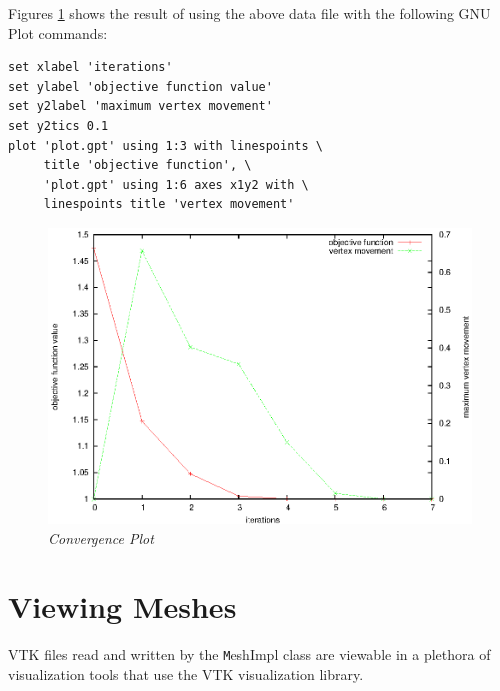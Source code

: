 Figures \ref{fig:iterplot} shows the result of using the above data file with the following GNU Plot commands:
\begin{verbatim}
set xlabel 'iterations'
set ylabel 'objective function value'
set y2label 'maximum vertex movement'
set y2tics 0.1
plot 'plot.gpt' using 1:3 with linespoints \
     title 'objective function', \
     'plot.gpt' using 1:6 axes x1y2 with \
     linespoints title 'vertex movement'
\end{verbatim}

\begin{figure}[htb!]
\begin{center}
\includegraphics[width=5in]{iterplot}
\caption{\em Convergence Plot \label{fig:iterplot}}
\end{center}
\end{figure}

\section{Viewing Meshes}

VTK files read and written by the {\texttt MeshImpl} class are viewable in a plethora of visualization tools that use the VTK visualization library.

